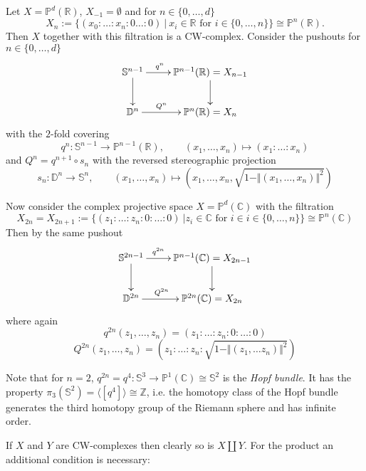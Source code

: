 \documentclass[11pt]{book}
\numberwithin{dummy}{section}
\theoremstyle{nonumberbreak}
\newenvironment{ex}[1][]{\ifthenelse{\equal{#1}{}}{\example}{\example[#1]}\rm}{\endexample}
\newcommand{\la}{\longrightarrow}
\newcommand{\Z}{\mathbb{Z}}
\begin{document}
\begin{spacing}{1.4}
\begin{ex}
\begin{compactenum}
\item Let $X= \mathbb{P}^d(\mathbb{R})$, $X_{-1}= \emptyset$ and for $n\in \{0, \ldots, d\}$
$$X_n:= \{ (x_0: \ldots: x_n:0 \ldots : 0 ) \ \vert \ x_i \in \mathbb{R} \textrm{ for } i \in \{0, \ldots, n\} \} \cong \mathbb{P}^n(\mathbb{R}).$$
Then $X$ together with this filtration is a CW-complex. Consider the pushouts for $n \in \{0, \ldots, d \}$
$$
\begin{xy}
\xymatrix{
\mathbb{S}^{n-1} \ar[d] \ar[r]^{q^n\qquad  \ } & \mathbb{P}^{n-1}(\mathbb{R}) = X_{n-1} \ar[d] \\ \mathbb{D}^n \ar[r]^{Q^n \qquad } & \mathbb{P}^n(\mathbb{R}) = X_n
}
\end{xy}
$$
with the $2$-fold covering
$$q^n: \mathbb{S}^{n-1} \la \mathbb{P}^{n-1} (\mathbb{R}), \qquad (x_1, \ldots, x_n) \mapsto (x_1: \ldots : x_n)$$
and $Q^n= q^{n+1} \circ s_n$ with the reversed stereographic projection 
$$s_n: \mathbb{D}^n \la \mathbb{S}^{n}, \qquad (x_1, \ldots, x_n) \mapsto \left(x_1, \ldots, x_n, \sqrt{1- \Vert (x_1, \ldots, x_n) \Vert^2 } \right)$$


\item Now consider the complex projective space $X= \mathbb{P}^{d}(\mathbb{C})$ with the filtration
$$X_{2n} = X_{2n+1} := \{ (z_1: \ldots : z_n:0: \ldots : 0 ) \ \vert z_i \in \mathbb{C} \textrm{ for } i \in i \in \{0, \ldots, n \} \} \cong \mathbb{P}^n(\mathbb{C})$$
Then by the same pushout
$$
\begin{xy}
\xymatrix{
\mathbb{S}^{2n-1} \ar[d] \ar[r]^{q^{2n} \qquad\ \  } & \mathbb{P}^{n-1}(\mathbb{C}) = X_{2n-1} \ar[d] \\ \mathbb{D}^{2n} \ar[r]^{Q^{2n}\qquad} & \mathbb{P}^{2n}(\mathbb{C}) = X_{2n} 
}
\end{xy}
$$
where again 
$$q^{2n}(z_1, \ldots, z_n) = \left( z_1:\ldots: z_n:0:\ldots:0\right)$$
$$Q^{2n}(z_1, \ldots, z_n) = \left( z_1: \ldots: z_n : \sqrt{1- \Vert (z_1, \ldots z_n) \Vert^2}\right)$$

Note that for $n=2$, $q^{2n}=q^4: \mathbb{S}^3 \la \mathbb{P}^1(\mathbb{C}) \cong \mathbb{S}^2$ is the \textit{Hopf bundle}. It has the property $\pi_3(\mathbb{S}^2) = \langle [q^4]\rangle \cong \Z$, i.e. the homotopy class of the Hopf bundle generates the third homotopy group of the Riemann sphere and has infinite order. 

\end{compactenum}
\end{ex}

If $X$ and $Y$ are CW-complexes then clearly so is $X \amalg Y$. For the product an additional condition is necessary:






\end{spacing}
\end{document}
